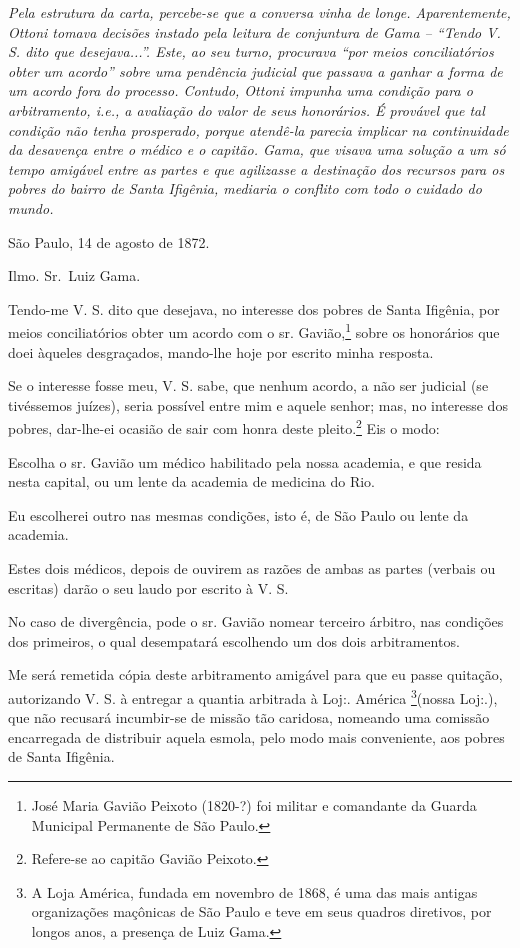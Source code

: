 \begin{didascalia}
\emph{Pela estrutura da carta, percebe-se que a conversa vinha de longe.
Aparentemente, Ottoni tomava decisões instado pela leitura de conjuntura
de Gama -- ``Tendo V. S. dito que desejava...''. Este, ao seu turno,
procurava ``por meios conciliatórios obter um acordo'' sobre uma pendência
judicial que passava a ganhar a forma de um acordo fora do processo.
Contudo, Ottoni impunha uma condição para o arbitramento, i.e., a
avaliação do valor de seus honorários. É provável que tal condição não
tenha prosperado, porque atendê-la parecia implicar na continuidade da
desavença entre o médico e o capitão. Gama, que visava uma solução a um
só tempo amigável entre as partes e que agilizasse a destinação dos
recursos para os pobres do bairro de Santa Ifigênia, mediaria o conflito
com todo o cuidado do mundo.}
\end{didascalia}

\asterisc{}

São Paulo, 14 de agosto de 1872.

Ilmo. Sr.~Luiz Gama.

Tendo-me V. S. dito que desejava, no interesse dos pobres de Santa
Ifigênia, por meios conciliatórios obter um acordo com o sr.
Gavião,\footnote{ José Maria Gavião Peixoto (1820-?) foi militar e
  comandante da Guarda Municipal Permanente de São Paulo.} sobre os
honorários que doei àqueles desgraçados, mando-lhe hoje por escrito
minha resposta.

Se o interesse fosse meu, V. S. sabe, que nenhum acordo, a não ser
judicial (se tivéssemos juízes), seria possível entre mim e aquele
senhor; mas, no interesse dos pobres, dar-lhe-ei ocasião de sair com
honra deste pleito.\footnote{ Refere-se ao capitão Gavião Peixoto.} Eis
o modo:

Escolha o sr. Gavião um médico habilitado pela nossa academia, e que
resida nesta capital, ou um lente da academia de medicina do Rio.

Eu escolherei outro nas mesmas condições, isto é, de São Paulo ou lente
da academia.

Estes dois médicos, depois de ouvirem as razões de ambas as partes
(verbais ou escritas) darão o seu laudo por escrito à V. S.

No caso de divergência, pode o sr. Gavião nomear terceiro árbitro, nas
condições dos primeiros, o qual desempatará escolhendo um dos dois
arbitramentos.

Me será remetida cópia deste arbitramento amigável para que eu passe
quitação, autorizando V. S. à entregar a quantia arbitrada à Loj:.
América \footnote{ A Loja América, fundada em novembro de 1868, é uma
  das mais antigas organizações maçônicas de São Paulo e teve em seus
  quadros diretivos, por longos anos, a presença de Luiz Gama.}(nossa
Loj:.), que não recusará incumbir-se de missão tão caridosa, nomeando
uma comissão encarregada de distribuir aquela esmola, pelo modo mais
conveniente, aos pobres de Santa Ifigênia.


